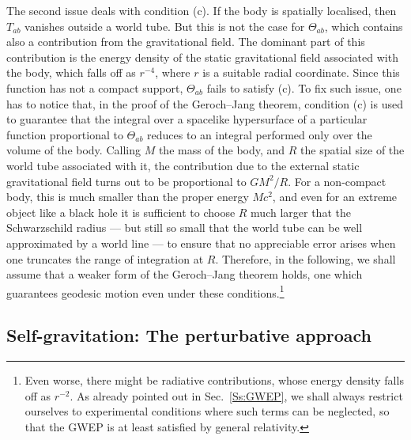 \documentclass[a4paper,showkeys,aps,prd,reprint,nofootinbib,showpacs,twocolumn]{revtex4-1}
\newcommand{\eq}[1]{\( #1 \)}
\theoremstyle{plain}
\begin{document}
The second issue deals with condition (c).  If the body is spatially localised, then \eq{T_{ab}} vanishes outside a world tube.  But this is not the case for \eq{\Theta_{ab}}, which contains also a contribution from the gravitational field.  The dominant part of this contribution is the energy density of the static gravitational field associated with the body, which falls off as \eq{r^{-4}}, where \eq{r} is a suitable radial coordinate.  Since this function has not a compact support, \eq{\Theta_{ab}} fails to satisfy (c).  To fix such issue, one has to notice that, in the proof of the Geroch--Jang theorem, condition (c) is used to guarantee that the integral over a spacelike hypersurface of a particular function proportional to \eq{\Theta_{ab}} reduces to an integral performed only over the volume of the body.  Calling \eq{M} the mass of the body, and \eq{R} the spatial size of the world tube associated with it, the contribution due to the external static gravitational field turns out to be proportional to \eq{{G M^2}/R}.  For a non-compact body, this is  much smaller than the proper energy \eq{M c^2}, and even for an extreme object like a black hole it is sufficient to choose \eq{R} much larger that the Schwarzschild radius --- but still so small that the world tube can be well approximated by a world line --- to ensure that no appreciable error arises when one truncates the range of integration at \eq{R}.  Therefore, in the following, we shall assume that a weaker form of the Geroch--Jang theorem holds, one which guarantees geodesic motion even under these conditions.\footnote{Even worse, there might be radiative contributions, whose energy density falls off as \eq{r^{-2}}.  As already pointed out in Sec.~\ref{Ss:GWEP}, we shall always restrict ourselves to experimental conditions where such terms can be neglected, so that the GWEP is at least satisfied by general relativity.}

\subsection{Self-gravitation: The perturbative approach}
\label{Ss:sg}
\end{document}
